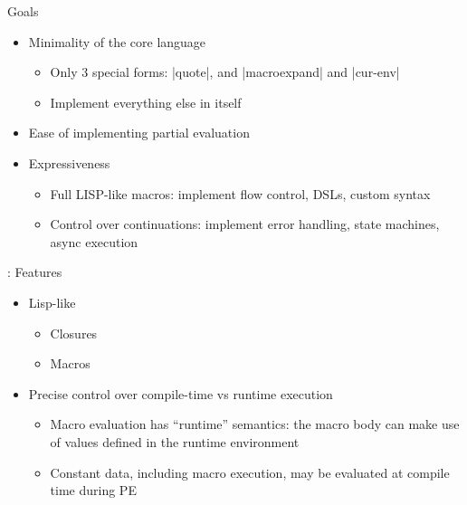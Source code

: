 

\begin{frame}
\maketitle
\end{frame}

\begin{frame}[fragile]{Goals}
\begin{itemize}
    \item Minimality of the core language
        \begin{itemize}
            \item Only 3 special forms: \linline|quote|, and \linline|macroexpand| and \linline|cur-env|
            \item Implement everything else in \lang itself
        \end{itemize}
    \item Ease of implementing partial evaluation
    \item Expressiveness
        \begin{itemize}
            \item Full LISP-like macros: implement flow control, DSLs, custom syntax
            \item Control over continuations: implement error handling, state machines, async execution
        \end{itemize}
\end{itemize}
\end{frame}

\begin{frame}[fragile]{\lang: Features}
\begin{itemize}
    \item Lisp-like
        \begin{itemize}
            \item Closures
            \item Macros
        \end{itemize}
    \item Precise control over compile-time vs runtime execution
        \begin{itemize}
            \item Macro evaluation has ``runtime'' semantics: the macro body can make use of values defined in the runtime environment
            \item Constant data, including macro execution, may be evaluated at compile time during PE
        \end{itemize}
\end{itemize}
\end{frame}

